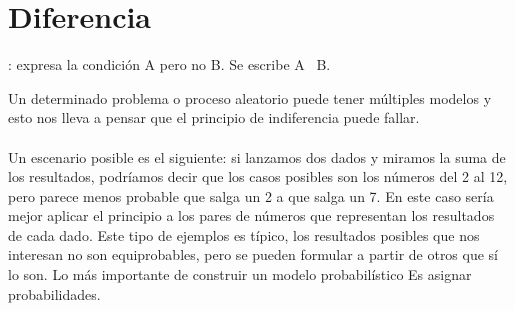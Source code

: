 \documentclass[12pt]{book}
\begin{document}
\section{Diferencia}: expresa la condición A pero no B. Se escribe A \ B.


Un determinado problema o proceso aleatorio puede tener múltiples modelos y esto nos lleva a pensar que el principio de indiferencia puede fallar.
\\
\\
Un escenario posible es el siguiente: si lanzamos dos dados y miramos la suma de los resultados, podríamos decir que los casos posibles son los números del 2 al 12, pero parece menos probable que salga un 2 a que salga un 7. En este caso sería mejor aplicar el principio a los pares de números que representan los resultados de cada dado. Este tipo de ejemplos es típico, los resultados posibles que nos interesan no son equiprobables, pero se pueden formular a partir de otros que sí lo son. Lo más importante de construir un modelo probabilístico Es asignar probabilidades.
\end{document}
